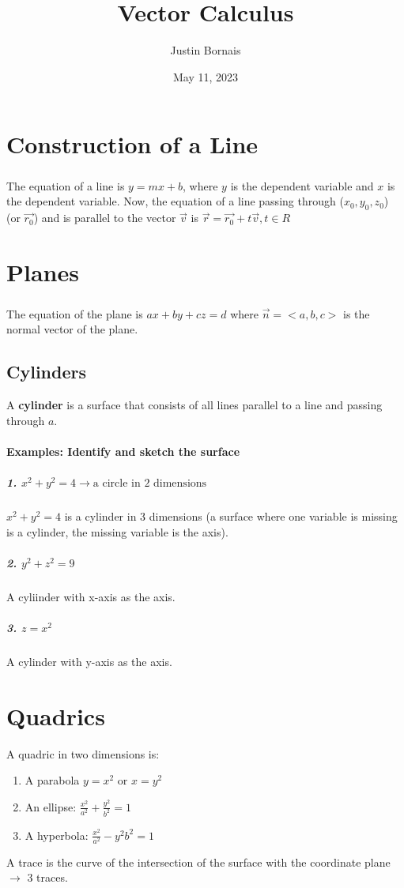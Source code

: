 \documentclass{article}
\title{Vector Calculus}
\author{Justin Bornais}
\date{May 11, 2023}
\begin{document}
\maketitle

\section{Construction of a Line}
\subparagraph{}
The equation of a line is $y=mx+b$, where $y$ is the dependent variable and $x$ is the dependent variable. Now, the equation of a line passing through ($x_0,y_0,z_0$) (or $\vec{r_0}$) and is parallel to the vector $\vec{v}$ is $\vec{r}=\vec{r_0}+t\vec{v}, t\in R$
\section{Planes}
\subparagraph{}
The equation of the plane is $ax+by+cz=d$ where $\vec{n}=<a,b,c>$ is the normal vector of the plane.
\subsection{Cylinders}
A \textbf{cylinder} is a surface that consists of all lines parallel to a line and passing through $a$.
\paragraph[Examples]{Examples: Identify and sketch the surface}
\subparagraph{1. $x^2+y^2=4\rightarrow \text{a circle in 2 dimensions} $}
$x^2+y^2=4$ is a cylinder in 3 dimensions (a surface where one variable is missing is a cylinder, the missing variable is the axis).
\subparagraph{2. $y^2+z^2=9$} A cyliinder with x-axis as the axis.
\subparagraph{3. $z=x^2$} A cylinder with y-axis as the axis.

\section{Quadrics}
A quadric in two dimensions is:
\begin{enumerate}
    \item A parabola $y=x^2$ or $x=y^2$
    \item An ellipse: $\frac{x^2}{a^2}+\frac{y^2}{b^2}=1$
    \item A hyperbola: $\frac{x^2}{a^2}-{y^2}{b^2}=1$
\end{enumerate}
A trace is the curve of the intersection of the surface with the coordinate plane $\rightarrow$ 3 traces.
\newpage
\end{document}
